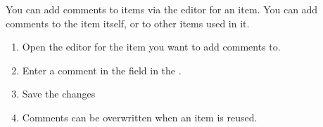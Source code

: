
You can add comments to items via the editor for an item. You can add comments to the item itself, or to other items used in it. 


\begin{enumerate}
\item Open the editor for the item you want to add comments to. 
\item Enter a comment in the  field in the  \gdpropview{}. 
\item Save the changes
\item Comments can be overwritten when an item is reused.
\end{enumerate}
